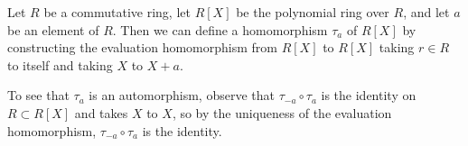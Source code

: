 \documentclass[12pt]{article}
\begin{document}
Let $R$ be a commutative ring, let $R[X]$ be the polynomial ring over $R$, and let $a$ be an element of $R$.  Then we can define a homomorphism $\tau_a$ of $R[X]$ by constructing the evaluation homomorphism from $R[X]$ to $R[X]$ taking $r\in R$ to itself and taking $X$ to $X+a$.  

To see that $\tau_a$ is an automorphism, observe that $\tau_{-a}\circ\tau_a$ is the identity on $R\subset R[X]$ and takes $X$ to $X$, so by the uniqueness of the evaluation homomorphism, $\tau_{-a}\circ\tau_{a}$ is the identity.
\end{document}
